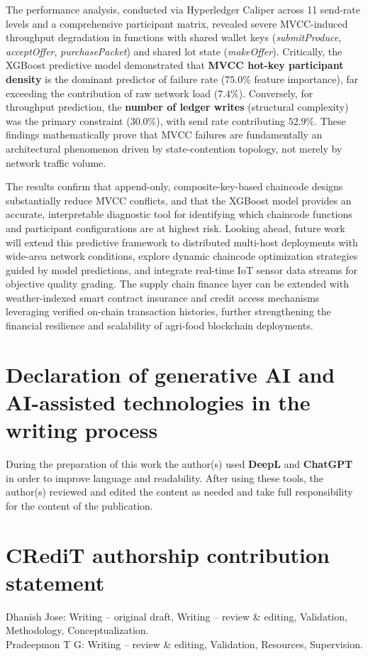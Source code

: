 \documentclass[manuscript,screen]{acmart}
\begin{document}
	The performance analysis, conducted via Hyperledger Caliper across 11 send-rate levels and a comprehensive participant matrix, revealed severe MVCC-induced throughput degradation in functions with shared wallet keys (\textit{submitProduce}, \textit{acceptOffer}, \textit{purchasePacket}) and shared lot state (\textit{makeOffer}). Critically, the XGBoost predictive model demonstrated that \textbf{MVCC hot-key participant density} is the dominant predictor of failure rate ($75.0\%$ feature importance), far exceeding the contribution of raw network load ($7.4\%$). Conversely, for throughput prediction, the \textbf{number of ledger writes} (structural complexity) was the primary constraint ($30.0\%$), with send rate contributing $52.9\%$. These findings mathematically prove that MVCC failures are fundamentally an architectural phenomenon driven by state-contention topology, not merely by network traffic volume.
	
	The results confirm that append-only, composite-key-based chaincode designs substantially reduce MVCC conflicts, and that the XGBoost model provides an accurate, interpretable diagnostic tool for identifying which chaincode functions and participant configurations are at highest risk. Looking ahead, future work will extend this predictive framework to distributed multi-host deployments with wide-area network conditions, explore dynamic chaincode optimization strategies guided by model predictions, and integrate real-time IoT sensor data streams for objective quality grading. The supply chain finance layer can be extended with weather-indexed smart contract insurance and credit access mechanisms leveraging verified on-chain transaction histories, further strengthening the financial resilience and scalability of agri-food blockchain deployments.
	
		
	\section*{Declaration of generative AI and AI-assisted technologies in the writing process}
	During the preparation of this work the author(s) used \textbf{DeepL} and \textbf{ChatGPT} in order to improve language and readability. 
	After using these tools, the author(s) reviewed and edited the content as needed and take full responsibility for the content of the publication.
	
	\section*{CRediT authorship contribution statement}
	Dhanish Jose: Writing – original draft, Writing – review \& editing, Validation, Methodology, Conceptualization.\\
	Pradeepmon T G: Writing – review \& editing, Validation, Resources, Supervision.
	
\end{document}
